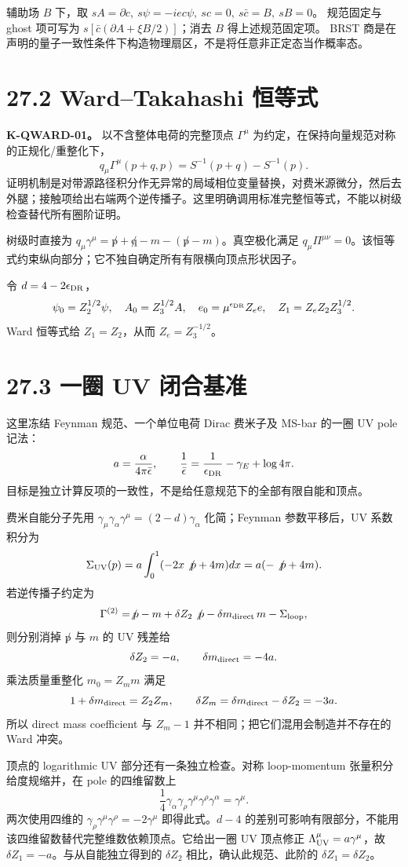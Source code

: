 \documentclass[
  11pt,
  oneside]{book}
\begin{document}
辅助场 \(B\) 下，取
\(sA=\partial c,\ s\psi=-iec\psi,\ sc=0,\ s\bar c=B,\ sB=0\)。
规范固定与 ghost 项可写为 \(s[\bar c(\partial A+\xi B/2)]\)；消去 \(B\)
得上述规范固定项。 BRST
商是在声明的量子一致性条件下构造物理扇区，不是将任意非正定态当作概率态。

\section{27.2 Ward--Takahashi 恒等式}

\textbf{K-QWARD-01。} 以不含整体电荷的完整顶点 \(\Gamma^\mu\)
为约定，在保持向量规范对称的正规化/重整化下， \[
q_\mu\Gamma^\mu(p+q,p)=S^{-1}(p+q)-S^{-1}(p).
\]
证明机制是对带源路径积分作无异常的局域相位变量替换，对费米源微分，然后去外腿；接触项给出右端两个逆传播子。这里明确调用标准完整恒等式，不能以树级检查替代所有圈阶证明。

树级时直接为
\(q_\mu\gamma^\mu=\not p+\not q-m-(\not p-m)\)。真空极化满足
\(q_\mu\Pi^{\mu\nu}=0\)。该恒等式约束纵向部分；它不独自确定所有有限横向顶点形状因子。

令 \(d=4-2\epsilon_{\rm DR}\)， \[
\psi_0=Z_2^{1/2}\psi,\quad A_0=Z_3^{1/2}A,\quad
e_0=\mu^{\epsilon_{\rm DR}}Z_e e,\quad
Z_1=Z_eZ_2Z_3^{1/2}.
\] Ward 恒等式给 \(Z_1=Z_2\)，从而 \(Z_e=Z_3^{-1/2}\)。

\section{27.3 一圈 UV 闭合基准}

这里冻结 Feynman 规范、一个单位电荷 Dirac 费米子及 MS-bar 的一圈 UV pole
记法： \[
a=\frac{\alpha}{4\pi\bar\epsilon},\qquad
\frac1{\bar\epsilon}=\frac1{\epsilon_{\rm DR}}-\gamma_E+\log4\pi.
\] 目标是独立计算反项的一致性，不是给任意规范下的全部有限自能和顶点。

费米自能分子先用
\(\gamma_\mu\gamma_\alpha\gamma^\mu=(2-d)\gamma_\alpha\) 化简；Feynman
参数平移后，UV 系数积分为 \[
\Sigma_{\rm UV}(p)=a\int_0^1(-2x\not p+4m)dx
=a(-\not p+4m).
\] 若逆传播子约定为 \[
\Gamma^{(2)}=\not p-m+\delta Z_2\not p
-\delta m_{\rm direct}\,m-\Sigma_{\rm loop},
\] 则分别消掉 \(\not p\) 与 \(m\) 的 UV 残差给 \[
\delta Z_2=-a,\qquad\delta m_{\rm direct}=-4a.
\] 乘法质量重整化 \(m_0=Z_m m\) 满足 \[
1+\delta m_{\rm direct}=Z_2Z_m,
\qquad\delta Z_m=\delta m_{\rm direct}-\delta Z_2=-3a.
\] 所以 direct mass coefficient 与 \(Z_m-1\)
并不相同；把它们混用会制造并不存在的 Ward 冲突。

顶点的 logarithmic UV 部分还有一条独立检查。对称 loop-momentum
张量积分给度规缩并，在 pole 的四维留数上 \[
\frac14\gamma_\alpha\gamma_\rho\gamma^\mu
\gamma^\rho\gamma^\alpha=\gamma^\mu.
\] 两次使用四维的 \(\gamma_\rho\gamma^\mu\gamma^\rho=-2\gamma^\mu\)
即得此式。\(d-4\)
的差别可影响有限部分，不能用该四维留数替代完整维数依赖顶点。它给出一圈
UV 顶点修正 \(\Lambda^\mu_{\rm UV}=a\gamma^\mu\)，故
\(\delta Z_1=-a\)。与从自能独立得到的 \(\delta Z_2\)
相比，确认此规范、此阶的 \(\delta Z_1=\delta Z_2\)。
\end{document}
